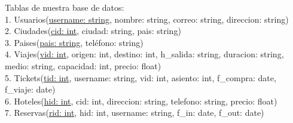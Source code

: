 \documentclass[letter]{article}
\begin{document}
	
	\begin{pregunta}
		
		\vspace{1cm}
		
		Tablas de nuestra base de datos:\\
		
		1. Usuarios(\underline{username: string}, nombre: string, correo: string, direccion: string)\\
		
		2. Ciudades(\underline{cid: int}, ciudad: string, pais: string)\\
		
		3. Paises(\underline{pais: string}, teléfono: string)\\
		
		4. Viajes(\underline{vid: int}, origen: int, destino: int, h\_salida: string, duracion: string, medio: string, capacidad: int, precio: float)\\
		
		5. Tickets(\underline{tid: int}, username: string, vid: int, asiento: int, f\_compra: date, f\_viaje: date)\\
		
		6. Hoteles(\underline{hid: int}, cid: int, direccion: string, telefono: string, precio: float)\\
		
		7. Reservas(\underline{rid: int}, hid: int, username: string, f\_in: date, f\_out: date)\\
		
		
		

	\end{pregunta}
\end{document}
